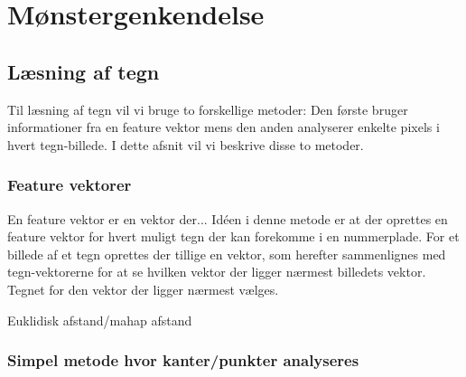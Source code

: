 \section{Mønstergenkendelse}
\label{sec_monster}

\begin{comment}
Noter fra møde med Søren 20/2:
Opret feature vektor $f$ for hvert bogstav $\omega$
Finde middelværdivektor for hvert $\omega$.
Afstandsfunktion: den afstand til en middelværdivektor der er mindst, vælges. Dvs. det bogstav vælges.
Featurevektorafstand udregnes hver gang

Euklidisk afstand
En-eller-anden mahap afstand
\end{comment}

\subsection{Læsning af tegn}

Til læsning af tegn vil vi bruge to forskellige metoder: Den første bruger informationer fra en feature vektor mens den anden analyserer enkelte pixels i hvert tegn-billede. I dette afsnit vil vi beskrive disse to metoder.

\subsubsection{Feature vektorer}
En feature vektor er en vektor der... Idéen i denne metode er at der oprettes en feature vektor for hvert muligt tegn der kan forekomme i en nummerplade. For et billede af et tegn oprettes der tillige en vektor, som herefter sammenlignes med tegn-vektorerne for at se hvilken vektor der ligger nærmest billedets vektor. Tegnet for den vektor der ligger nærmest vælges.

Euklidisk afstand/mahap afstand

\subsubsection{Simpel metode hvor kanter/punkter analyseres}